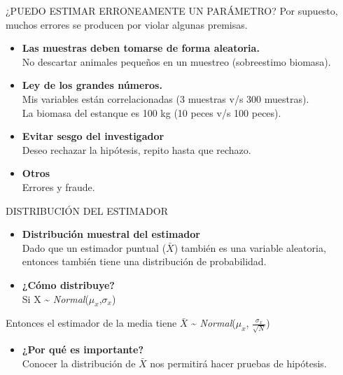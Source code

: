 \documentclass[
  ignorenonframetext,
]{beamer}
\providecommand{\tightlist}{%
  \setlength{\itemsep}{0pt}\setlength{\parskip}{0pt}}
\begin{document}
\begin{frame}{¿PUEDO ESTIMAR ERRONEAMENTE UN PARÁMETRO?}
\protect\hypertarget{puedo-estimar-erroneamente-un-paruxe1metro}{}
Por supuesto, muchos errores se producen por violar algunas premisas.

\begin{itemize}
\item
  \textbf{Las muestras deben tomarse de forma aleatoria.}\\
  No descartar animales pequeños en un muestreo (sobreestimo biomasa).
\item
  \textbf{Ley de los grandes números.}\\
  Mis variables están correlacionadas (3 muestras v/s 300 muestras).\\
  La biomasa del estanque es 100 kg (10 peces v/s 100 peces).
\item
  \textbf{Evitar sesgo del investigador}\\
  Deseo rechazar la hipótesis, repito hasta que rechazo.
\item
  \textbf{Otros}\\
  Errores y fraude.
\end{itemize}
\end{frame}

\begin{frame}{DISTRIBUCIÓN DEL ESTIMADOR}
\protect\hypertarget{distribuciuxf3n-del-estimador}{}
\begin{itemize}
\item
  \textbf{Distribución muestral del estimador}\\
  Dado que un estimador puntual (\(\bar{X}\)) también es una variable
  aleatoria, entonces también tiene una distribución de probabilidad.
\item
  \textbf{¿Cómo distribuye?}\\
  Si X \textasciitilde{} \emph{Normal}(\(\mu_{x}\),\(\sigma_{x}\))
\end{itemize}

Entonces el estimador de la media tiene \(\bar{X}\) \textasciitilde{}
\emph{Normal}(\(\mu_{x}\), \(\frac{\sigma_x}{\sqrt{N}}\))

\begin{itemize}
\tightlist
\item
  \textbf{¿Por qué es importante?}\\
  Conocer la distribución de \(\bar{X}\) nos permitirá hacer pruebas de
  hipótesis.
\end{itemize}
\end{frame}
\end{document}
